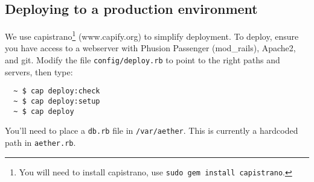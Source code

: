 \subsection{Deploying to a production environment}
We use capistrano\footnote{You will need to install capistrano, use {\tt sudo gem install capistrano}.} (www.capify.org) to simplify deployment. To deploy, ensure you have access to a webserver with Phusion Passenger (mod\_rails), Apache2, and git. Modify the file \verb!config/deploy.rb! to point to the right paths and servers, then type:
\begin{verbatim}
  ~ $ cap deploy:check
  ~ $ cap deploy:setup
  ~ $ cap deploy
\end{verbatim}
You'll need to place a \verb!db.rb! file in \verb!/var/aether!. This is currently a hardcoded path in \verb!aether.rb!.
